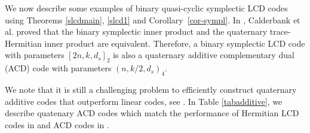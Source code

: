 \documentclass[a4paper,12pt]{article}
\begin{document}


We now describe some examples of binary quasi-cyclic symplectic LCD codes using Theorems \ref{slcdmain}, \ref{slcd1} and Corollary~\ref{cor-sympl}.  
In \cite{calderbank1998}, Calderbank  et al. proved that the binary symplectic inner product and the quaternary trace-Hermitian inner product are equivalent. Therefore, a binary symplectic LCD code with parameters $[2n, k, d_s]_{2}$ is also a quaternary additive complementary dual (ACD) code with parameters $(n, k/2, d_s)_{4}$.

We note that it is still a challenging problem to efficiently construct quaternary additive codes that outperform linear codes, see \cite{guan2023b}. In Table \ref{tabadditive}, we describe quatenary ACD codes
which match the performance of Hermitian LCD codes in \cite{araya2024} and ACD codes in \cite{guan2023b}.
\end{document}
